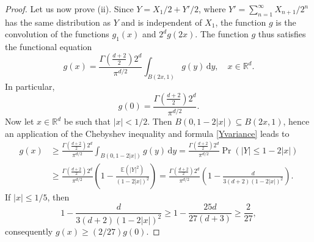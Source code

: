 \documentclass[11pt,a4paper]{article}
\theoremstyle{definition}
\begin{document}
\begin{proof}
Let us now prove (ii). Since $Y=X_1/2+Y'/2$, where $Y'=\sum_{n=1}^{\infty} X_{n+1}/2^n$ has the same distribution as $Y$ and is independent of $X_1$, the function $g$ is the convolution of the functions $g_1(x)$ and $2^d g(2x)$. The function $g$ thus satisfies the functional equation
\[ g(x) = \frac{\Gamma \left( \frac{d+2}{2} \right) 2^d}{\pi^{d/2}} \int_{B(2x,1)} g(y) \, \mathrm{d}y , \quad x \in \mathbb{R}^d .  \]
In particular,
\[ g(0)= \frac{\Gamma \left( \frac{d+2}{2} \right) 2^d}{\pi^{d/2}} . \]
Now let $x \in \mathbb{R}^d$ be such that $|x|<1/2$. Then $B(0,1-2|x|) \subseteq B(2x,1)$, hence an application of the Chebyshev inequality and formula \eqref{Yvariance} leads to
\[ \begin{split} g(x) &\ge \frac{\Gamma \left( \frac{d+2}{2} \right) 2^d}{\pi^{d/2}} \int_{B(0,1-2|x|)} g(y) \, \mathrm{d}y = \frac{\Gamma \left( \frac{d+2}{2} \right) 2^d}{\pi^{d/2}} \Pr (|Y| \le 1-2|x|) \\ &\ge \frac{\Gamma \left( \frac{d+2}{2} \right) 2^d}{\pi^{d/2}} \left( 1-\frac{\mathbb{E}(|Y|^2)}{(1-2|x|)^2} \right) = \frac{\Gamma \left( \frac{d+2}{2} \right) 2^d}{\pi^{d/2}} \left( 1-\frac{d}{3(d+2)(1-2|x|)^2} \right) . \end{split} \]
If $|x| \le 1/5$, then
\[ 1-\frac{d}{3(d+2)(1-2|x|)^2} \ge 1- \frac{25d}{27(d+3)} \ge \frac{2}{27}, \]
consequently $g(x) \ge (2/27) g(0)$.


\end{proof}
\end{document}
